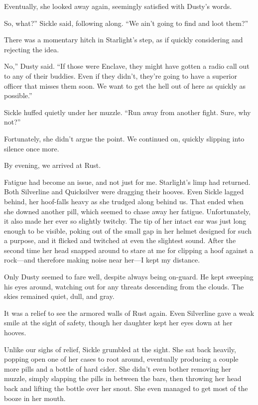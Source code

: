 Eventually, she looked away again, seemingly satisfied with Dusty’s words.

\leavevmode{}So, what?” Sickle said, following along. “We ain’t going to find and loot them?”

There was a momentary hitch in Starlight’s step, as if quickly considering and rejecting the idea.

\leavevmode{}No,” Dusty said. “If those were Enclave, they might have gotten a radio call out to any of their buddies. Even if they didn’t, they’re going to have a superior officer that misses them soon. We want to get the hell out of here as quickly as possible.”

Sickle huffed quietly under her muzzle. “Run away from another fight. Sure, why not?”

Fortunately, she didn’t argue the point. We continued on, quickly slipping into silence once more.

{\br}%
By evening, we arrived at Rust.

Fatigue had become an issue, and not just for me. Starlight’s limp had returned. Both Silverline and Quicksilver were dragging their hooves. Even Sickle lagged behind, her hoof-falls heavy as she trudged along behind us. That ended when she downed another pill, which seemed to chase away her fatigue. Unfortunately, it also made her ever so slightly twitchy. The tip of her intact ear was just long enough to be visible, poking out of the small gap in her helmet designed for such a purpose, and it flicked and twitched at even the slightest sound. After the second time her head snapped around to stare at me for clipping a hoof against a rock—and therefore making noise near her—I kept my distance.

Only Dusty seemed to fare well, despite always being on-guard. He kept sweeping his eyes around, watching out for any threats descending from the clouds. The skies remained quiet, dull, and gray.

It was a relief to see the armored walls of Rust again. Even Silverline gave a weak smile at the sight of safety, though her daughter kept her eyes down at her hooves.

Unlike our sighs of relief, Sickle grumbled at the sight. She sat back heavily, popping open one of her cases to root around, eventually producing a couple more pills and a bottle of hard cider. She didn’t even bother removing her muzzle, simply slapping the pills in between the bars, then throwing her head back and lifting the bottle over her snout. She even managed to get most of the booze in her mouth.

